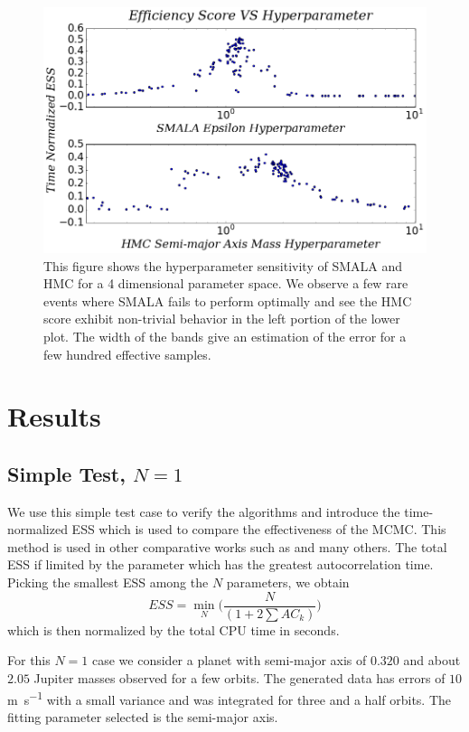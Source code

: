 \documentclass{aa}
\begin{document}
\begin{figure}
\centering
\includegraphics[width=0.95\hsize]{sensitivity-1.png}
   \caption{This figure shows the hyperparameter sensitivity of SMALA and HMC for a 4 dimensional parameter space. We observe a few rare events where SMALA fails to perform optimally and see the HMC score exhibit non-trivial behavior in the left portion of the lower plot. The width of the bands give an estimation of the error for a few hundred effective samples.}
      \label{sensfig}
\end{figure}

\section{Results}\label{results}
\subsection{Simple Test, $N=1$}
We use this simple test case to verify the algorithms and introduce the time-normalized ESS which is used to compare the effectiveness of the MCMC. This method is used in other comparative works such as \cite{Girolami2011, 1504.01418, Meyer2016, Lan2015} and many others. The total ESS if limited by the parameter which has the greatest autocorrelation time. Picking the smallest ESS among the $N$ parameters, we obtain $$ESS = \min_N\bigg( \frac{N}{(1+2\sum AC_k)}\bigg)$$ which is then normalized by the total CPU time in seconds. 

For this $N=1$ case we consider a planet with semi-major axis of $0.320$ and about $2.05$ Jupiter masses observed for a few orbits. The generated data has errors of $10$ \si{\metre\per\second} with a small variance and was integrated for three and a half orbits. The fitting parameter selected is the semi-major axis.
\end{document}
